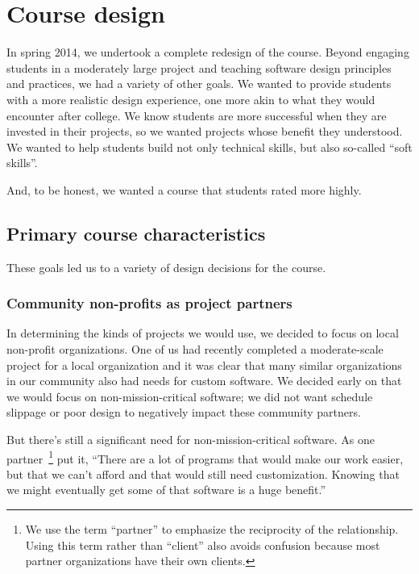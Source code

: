 \section{Course design}


In spring 2014, we undertook a complete redesign of the course.  
Beyond engaging students in a moderately large project and teaching 
software design principles and practices, 
we had a variety of other goals. 
We wanted
to provide students with a more realistic design experience, one more
akin to what they would encounter after college.  We know students
are more successful when they are invested in their projects, so we
wanted projects whose benefit they understood.  We wanted to help
students build not only technical skills, but also so-called ``soft
skills''.  

And, to be honest, we wanted a course that students rated more highly.

\subsection{Primary course characteristics}

These goals led us to a variety of design decisions for the course.

\subsubsection{Community non-profits as project partners}

In determining the kinds of projects we would use, we decided to
focus on local non-profit organizations.  One of us had recently
completed a moderate-scale project for a local organization and it
was clear that many similar organizations in our community also had
needs for custom software.  We decided early on that we would focus
on non-mission-critical software; we did not want schedule slippage
or poor design to negatively impact these community partners.

But there's still a significant need for non-mission-critical software.
As one partner~\footnote{We use the term ``partner'' to emphasize the
reciprocity of the relationship.  Using this term rather than ``client'' 
also avoids confusion because most partner organizations have their own 
clients.} put it, ``There are a lot of programs that would make
our work easier, but that we can't afford and that would still need
customization.  Knowing that we might eventually get some of that
software is a huge benefit.''  

